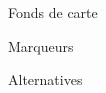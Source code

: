 \begin{frame}{Fonds de carte}
  
\end{frame}

\begin{frame}{Marqueurs}
  
\end{frame}

\begin{frame}{Alternatives}
  
\end{frame}
